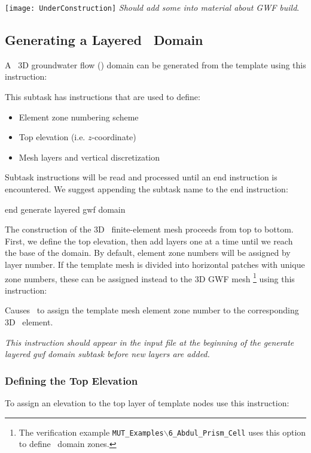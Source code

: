 \label{texfile:GWF}
\texttt{[image: UnderConstruction]} \textit{
Should add some into material about GWF build}.

\subsection{Generating a Layered \gwf\ Domain}
A \mfus\ 3D groundwater flow (\gwf) domain can be generated from the template using this instruction:

    {This subtask has instructions that are used to define:
     \begin{itemize}
        \item Element zone numbering scheme
        \item Top elevation (i.e. $z$-coordinate)
        \item Mesh layers and vertical discretization
    \end{itemize}

    Subtask instructions will be read and processed until an \textsf{end} instruction is encountered.  We suggest appending the subtask name to the \textsf{end} instruction:

    {\Large \sf end generate layered gwf domain}
    }

The construction of the 3D \gwf\ finite-element mesh proceeds from top to bottom.  First, we define the top elevation, then add layers one at a time until we reach the base of the domain. By default, element zone numbers will be assigned by layer number.  If the template mesh is divided into horizontal patches with unique zone numbers, these can be assigned instead to the 3D GWF mesh \footnote{The verification example \texttt{MUT\_Examples$\backslash$6\_Abdul\_Prism\_Cell} uses this option to define \swf\ domain zones.} using this instruction:

    {Causes \mut\ to assign the template mesh element zone number to the corresponding 3D \gwf\ element.

    {\em This instruction should appear in the input file at the beginning of the \textsf{generate layered gwf domain} subtask before new layers are added.}
    }

\subsubsection{Defining the Top Elevation}
To assign an elevation to the top layer of template nodes use this instruction:

